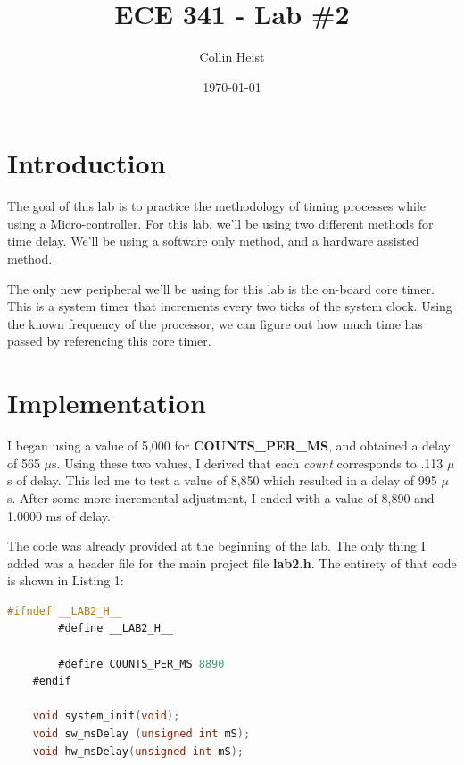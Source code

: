 \documentclass[a4paper, 12pt]{article}
\begin{document}
\title{ECE 341 - Lab \#2}
\author{Collin Heist}
\date{\today}
\maketitle
{}
\tableofcontents
\lstlistoflistings
\newpage
{}

\section{Introduction}
The goal of this lab is to practice the methodology of timing processes while using a Micro-controller. For this lab, we'll be using two different methods for time delay. We'll be using a software only method, and a hardware assisted method.

The only new peripheral we'll be using for this lab is the on-board core timer. This is a system timer that increments every two ticks of the system clock. Using the known frequency of the processor, we can figure out how much time has passed by referencing this core timer.

\section{Implementation}
I began using a value of 5,000 for \textbf{COUNTS\_PER\_MS}, and obtained a delay of 565 $\mu$s. Using these two values, I derived that each \textit{count} corresponds to .113 $\mu$s of delay. This led me to test a value of 8,850 which resulted in a delay of 995 $\mu$s. After some more incremental adjustment, I ended with a value of 8,890 and 1.0000 ms of delay.

The code was already provided at the beginning of the lab. The only thing I added was a header file for the main project file \textbf{lab2.h}. The entirety of that code is shown in Listing 1:

	\begin{mdframed}[backgroundcolor=code-gray, roundcorner=10pt,
								innerleftmargin=5, innertopmargin=5, innerbottommargin=5]	
	\begin{lstlisting}[language=C, caption=Project Header File (lab2.h), tabsize=2]
	#ifndef __LAB2_H__
		#define __LAB2_H__

		#define COUNTS_PER_MS 8890
	#endif

	void system_init(void);
	void sw_msDelay (unsigned int mS);
	void hw_msDelay(unsigned int mS);
	\end{lstlisting}
	\end{mdframed}
	
\end{document}
